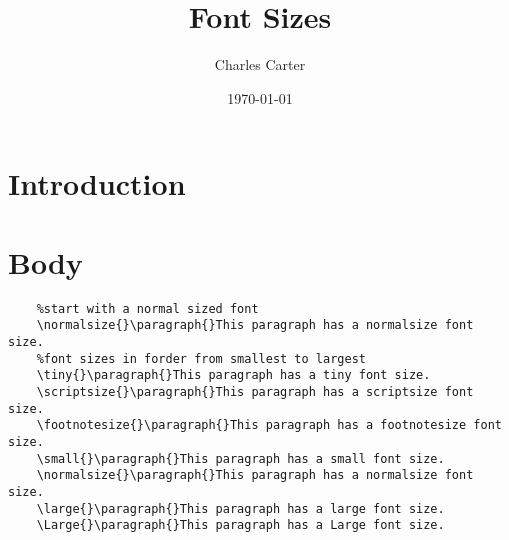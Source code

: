 \documentclass{article}
\title{Font Sizes}
\author{Charles Carter}
\date{\today{}}
\begin{document}
 
    \maketitle{}
    \tableofcontents{}
    \section{Introduction}
    \label{Introduction}
    \section{Body}
    \label{Body}
    \begin{lstlisting}
    %start with a normal sized font
    \normalsize{}\paragraph{}This paragraph has a normalsize font size.
    %font sizes in forder from smallest to largest
    \tiny{}\paragraph{}This paragraph has a tiny font size.
    \scriptsize{}\paragraph{}This paragraph has a scriptsize font size.
    \footnotesize{}\paragraph{}This paragraph has a footnotesize font size.
    \small{}\paragraph{}This paragraph has a small font size.
    \normalsize{}\paragraph{}This paragraph has a normalsize font size.
    \large{}\paragraph{}This paragraph has a large font size.
    \Large{}\paragraph{}This paragraph has a Large font size.

\end{lstlisting}
\end{document}
